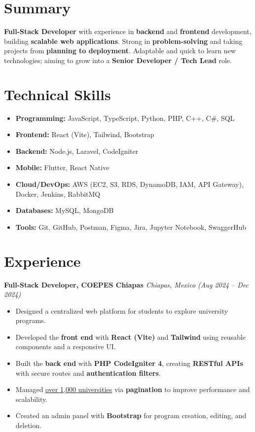 \section{Summary}
\textbf{Full-Stack Developer} with experience in \textbf{backend} and \textbf{frontend} development, building \textbf{scalable web applications}. Strong in \textbf{problem-solving} and taking projects from \textbf{planning to deployment}. Adaptable and quick to learn new technologies; aiming to grow into a \textbf{Senior Developer / Tech Lead} role.

\section{Technical Skills}
\begin{itemize}
    \item \textbf{Programming:} JavaScript, TypeScript, Python, PHP, C++, C\#, SQL
    \item \textbf{Frontend:} React (Vite), Tailwind, Bootstrap
    \item \textbf{Backend:} Node.js, Laravel, CodeIgniter
    \item \textbf{Mobile:} Flutter, React Native
    \item \textbf{Cloud/DevOps:} AWS (EC2, S3, RDS, DynamoDB, IAM, API Gateway), Docker, Jenkins, RabbitMQ
    \item \textbf{Databases:} MySQL, MongoDB
    \item \textbf{Tools:} Git, GitHub, Postman, Figma, Jira, Jupyter Notebook, SwaggerHub
\end{itemize}

\section{Experience}
\textbf{Full-Stack Developer, COEPES Chiapas \href{https://plataforma.ieppd.chiapas.gob.mx/coepes/react/}{\faLink}} \hfill \textit{Chiapas, Mexico (Aug 2024 -- Dec 2024)}
\begin{itemize}
    \item Designed a centralized web platform for students to explore university programs.
    \item Developed the \textbf{front end} with \textbf{React (Vite)} and \textbf{Tailwind} using reusable components and a responsive UI.
    \item Built the \textbf{back end} with \textbf{PHP CodeIgniter 4}, creating \textbf{RESTful APIs} with secure routes and \textbf{authentication filters}.
    \item Managed \underline{over 1,000 universities} via \textbf{pagination} to improve performance and scalability.
    \item Created an admin panel with \textbf{Bootstrap} for program creation, editing, and deletion.
\end{itemize}

